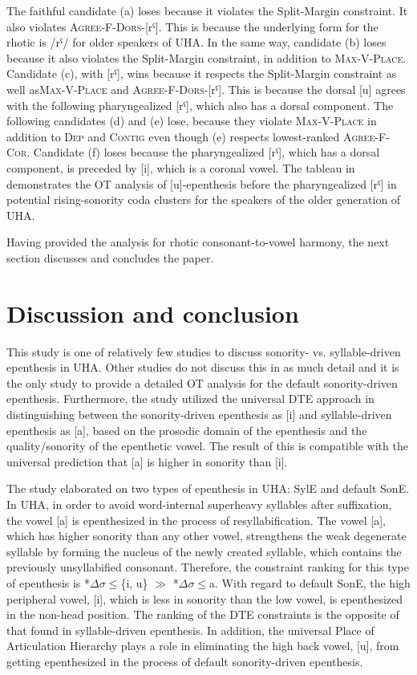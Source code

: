 \documentclass[output=paper,colorlinks,citecolor=brown]{langscibook}
\begin{document}
The faithful candidate (a) loses because it violates the Split-Margin constraint. It also violates \textsc{Agree-F-Dors-[}rˤ]. This is because the underlying form for the rhotic is /rˤ/ for older speakers of UHA. In the same way, candidate (b) loses because it also violates the Split-Margin constraint, in addition to \textsc{Max-V-Place}. Candidate (c), with [rˤ], wins because it respects the Split-Margin constraint as well as\textsc{Max-V-Place} and \textsc{Agree-F-Dors}-[rˤ]. This is because the dorsal [u] agrees with the following pharyngealized [rˤ], which also has a dorsal component. The following candidates (d) and (e) lose, because they violate \textsc{Max-V-Place} in addition to \textsc{Dep} and \textsc{Contig} even though (e) respects lowest-ranked \textsc{Agree-F-Cor}. Candidate (f) loses because the pharyngealized [rˤ], which has a dorsal component, is preceded by [i], which is a coronal vowel. The tableau in  demonstrates the OT analysis of [u]-epenthesis before the pharyngealized [rˤ] in potential rising-sonority coda clusters for the speakers of the older generation of UHA.

Having provided the analysis for rhotic consonant-to-vowel harmony, the next section discusses and concludes the paper.

\section{Discussion and conclusion}\label{disc}
This study is one of relatively few studies to discuss sonority- vs. syllable-driven epenthesis in UHA. Other studies do not discuss this in as much detail and it is the only study to provide a detailed OT analysis for the default sonority-driven epenthesis. Furthermore, the study utilized the universal DTE approach in distinguishing between the sonority-driven epenthesis as [i] and syllable-driven epenthesis as [a], based on the prosodic domain of the epenthesis and the quality/sonority of the epenthetic vowel. The result of this is compatible with the universal prediction that [a] is higher in sonority than [i]. 

The study elaborated on two types of epenthesis in UHA: SylE and default SonE. In UHA, in order to avoid word-internal superheavy syllables after suffixation, the vowel [a] is epenthesized in the process of resyllabification. The vowel [a], which has higher sonority than any other vowel, strengthens the weak degenerate syllable by forming the nucleus of the newly created syllable, which contains the previously unsyllabified consonant. Therefore, the constraint ranking for this type of epenthesis is *$\Delta \sigma $${\leq}$\{i, u\}  $\gg$  *$\Delta \sigma {\leq}$a. With regard to default SonE, the high peripheral vowel, [i], which is less in sonority than the low vowel, is epenthesized in the non-head position. The ranking of the DTE constraints is the opposite of that found in syllable-driven epenthesis. In addition, the universal Place of Articulation Hierarchy plays a role in eliminating the high back vowel, [u], from getting epenthesized in the process of default sonority-driven epenthesis. 
\end{document}
